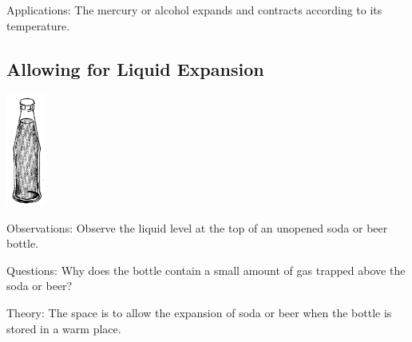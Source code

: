 \begin{multicols}{2}
\begin{description*}
\item[Applications:]{The mercury or alcohol expands and contracts according to its temperature.}
\end{description*}

\subsection{Allowing for Liquid Expansion}

\begin{center}
\includegraphics[width=0.1\textwidth]{./img/source/allowing-expansion-liquid.png}
\end{center}

\begin{description*}
\item[Observations:]{Observe the liquid level at the top of an unopened soda or beer bottle.}
\item[Questions:]{Why does the bottle contain a small amount of gas trapped above the soda or beer?}
\item[Theory:]{The space is to allow the expansion of soda or beer when the bottle is stored in a warm place.}
\end{description*}


\end{multicols}
